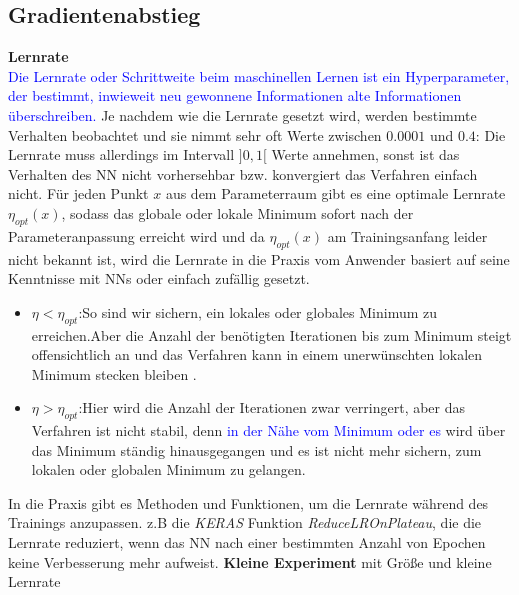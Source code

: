 \documentclass[12pt,a4paper]{scrartcl}
\numberwithin{equation}{section}
\begin{document}
\subsection{Gradientenabstieg}
\textbf{Lernrate}\\
\textcolor{blue}{Die Lernrate oder Schrittweite beim maschinellen Lernen ist ein Hyperparameter, der bestimmt, inwieweit neu gewonnene Informationen alte Informationen überschreiben\cite{LearningRate}.}
Je nachdem wie die Lernrate gesetzt wird, werden bestimmte Verhalten beobachtet und sie nimmt sehr oft Werte zwischen $ 0.0001 $ und $ 0.4 $:
Die Lernrate muss allerdings im Intervall  $]0,1[$ Werte annehmen, sonst ist das Verhalten des \ac{NN} nicht vorhersehbar bzw. konvergiert das Verfahren einfach nicht.
Für jeden Punkt $ x $ aus dem Parameterraum gibt es eine optimale Lernrate $ \eta_{opt}(x) $, sodass das globale oder lokale Minimum sofort nach der Parameteranpassung erreicht wird und da $ \eta_{opt}(x) $ am Trainingsanfang leider nicht bekannt ist, wird die Lernrate in die Praxis vom Anwender basiert auf seine Kenntnisse mit \acsp{NN} oder einfach zufällig gesetzt.
\begin{itemize}
	\item $ \eta < \eta_{opt} $:So sind wir sichern, ein lokales oder globales Minimum zu erreichen.Aber die Anzahl der benötigten Iterationen bis zum Minimum steigt offensichtlich an und das Verfahren kann in einem unerwünschten lokalen Minimum stecken bleiben .
	\item $ \eta > \eta_{opt} $:Hier wird die Anzahl der Iterationen zwar verringert, aber das Verfahren ist nicht stabil, denn \textcolor{blue}{in der Nähe vom Minimum oder es} wird über das Minimum ständig hinausgegangen und es ist nicht mehr sichern, zum lokalen oder globalen Minimum zu gelangen.
\end{itemize}
In die Praxis gibt es Methoden und Funktionen, um die Lernrate während des Trainings anzupassen. z.B die \textit{KERAS} Funktion \textit{ReduceLROnPlateau}, die die Lernrate reduziert, wenn das \ac{NN} nach einer bestimmten Anzahl von Epochen keine Verbesserung mehr aufweist.
\textcolor{RubineRed}{\textbf{Kleine Experiment} mit Größe und kleine Lernrate}
\end{document}
